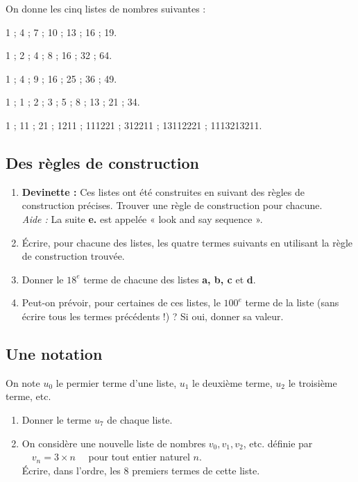 \documentclass[a4paper,11pt,exos]{nsi} %
\begin{document}
\maketitle



On donne les cinq listes de nombres suivantes :
\begin{enumalph}
	\item 	1 ; 4 ; 7 ; 10 ; 13 ; 16 ; 19.
	\item 	1 ; 2 ; 4 ; 8 ; 16 ; 32 ; 64.
	\item	1 ; 4 ; 9 ; 16 ; 25 ; 36 ; 49.
	\item	1 ; 1 ; 2 ; 3 ; 5 ; 8 ; 13 ; 21 ; 34.
	\item	1 ; 11 ; 21 ; 1211 ; 111221 ; 312211 ; 13112221 ; 1113213211.	
\end{enumalph}
\subsection{Des règles de construction}
\begin{enumerate}
	\item 	\textbf{Devinette :} Ces listes ont été construites en suivant des règles de construction précises. Trouver une règle de construction pour chacune.\\
	\textit{Aide :} La suite \textbf{e.} est appelée « look and say sequence ».\\[0.5em]
	\item 	\'Ecrire, pour chacune des listes, les quatre termes suivants en utilisant la règle de construction trouvée.\\[0.5em]
	\item	Donner le $18^{e}$ terme de chacune des listes \textbf{a, b, c} et \textbf{d}.\\[0.5em]
	\item	Peut-on prévoir, pour certaines de ces listes, le $100^{e}$ terme de la liste (sans écrire tous les termes précédents !) ? Si oui, donner sa valeur.\\[0.5em]
\end{enumerate}

\subsection{Une notation}
On note $u_0$ le permier terme d'une liste, $u_1$ le deuxième terme, $u_2$ le troisième terme, etc.
\begin{enumerate}
	\item 	Donner le terme $u_7$ de chaque liste.\\[0.5em]
	\item 	On considère une nouvelle liste de nombres $v_0,v_1,v_2$, etc. définie par $\quad v_n=3\times n \quad$ pour tout entier naturel $n$.\\
	\'Ecrire, dans l'ordre, les 8 premiers termes de cette liste.\\[0.5em]
\end{enumerate}
\end{document}
